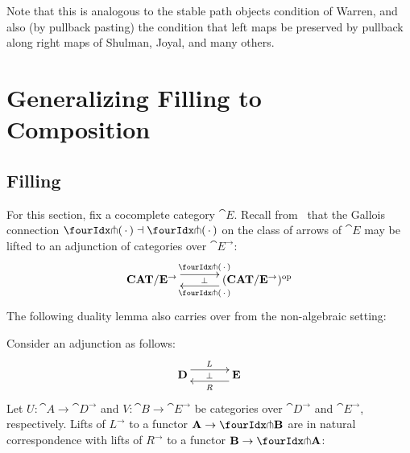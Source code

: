 \documentclass[reqno,10pt,a4paper,oneside]{amsart}
\begin{document}
Note that this is analogous to the stable path objects condition of Warren, and also (by pullback pasting) the condition that left maps be preserved by pullback along right maps of Shulman, Joyal, and many others.

\section{Generalizing Filling to Composition}

\subsection{Filling}

For this section, fix a cocomplete category $\cat{E}$.
Recall from~\cite{garner:small-object-argument} that the Gallois connection $\liftl{\brarghole} \dashv \liftr{\brarghole}$ on the class of arrows of $\cat{E}$ may be lifted to an adjunction of categories over $\cat{E}^{\to}$:
\begin{equation}
\label{garner-adjunction}
\begin{gathered}
\xymatrix@C+1em{
  \CAT/\cat{E}^{\to}
  \ar@<5pt>[r]^{\liftl{\brarghole}}
  \ar@{}[r]|{\bot}
&
  (\CAT/\cat{E}^{\to})^{\op}
  \ar@<5pt>[l]^{\liftr{\brarghole}}
}
\end{gathered}
\end{equation}
The following duality lemma also carries over from the non-algebraic setting:

\begin{lemma}
\label{lift-of-adjunction}
Consider an adjunction as follows:
\[
\xymatrix@C+1em{
  \cat{D}
  \ar@<5pt>[r]^{L}
  \ar@{}[r]|{\bot}
&
  \cat{E}
  \ar@<5pt>[l]^{R}
}
\]
Let $U : \cat{A} \to \cat{D}^{\to}$ and $V : \cat{B} \to \cat{E}^{\to}$ be categories over $\cat{D}^{\to}$ and $\cat{E}^{\to}$, respectively.
Lifts of $L^{\to}$ to a functor $\cat{A} \to \liftl{\cat{B}}$ are in natural correspondence with lifts of $R^{\to}$ to a functor $\cat{B} \to \liftr{\cat{A}}$:
\end{lemma}
\end{document}
